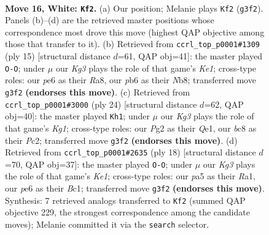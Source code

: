 \documentclass[11pt]{article}
\begin{document}
\begin{figure}[p]
\label{fig:thought-m28}
\end{figure}

\clearpage

\begin{figure}[p]\centering
\begin{subfigure}{0.46\textwidth}\centering
\resizebox{\linewidth}{!}{%
\newchessgame
\chessboard[
  setfen={1nb1qrk1/r1p1nppp/1p2p3/p2pP3/3P1P2/2N3K1/PPP3PP/R2Q1BNR w - - 2 16},
  showmover=false,
  pgfstyle=straightmove, color=movearrow, markmove={g3-f2}
]}
\caption{}
\end{subfigure}\hfill
\begin{subfigure}{0.46\textwidth}\centering
\resizebox{\linewidth}{!}{%
\newchessgame
\chessboard[
  setfen={rn1qk2r/pbpp1ppp/1p2p3/8/2PPn3/P3BNP1/1P2PP1P/R2QKB1R b KQkq - 0 8},
  showmover=false,
  pgfstyle=straightmove, color=movearrow, markmove={e8-g8}
]}
\caption{}
\end{subfigure}
\\[4pt]
\begin{subfigure}{0.46\textwidth}\centering
\resizebox{\linewidth}{!}{%
\newchessgame
\chessboard[
  setfen={r4rk1/p2qppbp/3p1np1/1pp5/4PP2/2NP1R2/PPPB2PP/2R1Q1K1 w - - 0 13},
  showmover=false,
  pgfstyle=straightmove, color=movearrow, markmove={g1-h1}
]}
\caption{}
\end{subfigure}\hfill
\begin{subfigure}{0.46\textwidth}\centering
\resizebox{\linewidth}{!}{%
\newchessgame
\chessboard[
  setfen={1rb1kb1r/5ppp/pq2pn2/1p6/2pP4/2N3P1/PP2PPBP/R1BQK2R w KQk - 0 10},
  showmover=false,
  pgfstyle=straightmove, color=movearrow, markmove={e1-g1}
]}
\caption{}
\end{subfigure}
\caption{\textbf{Move 16, White: \texttt{Kf2}.} (a) Our position; Melanie plays \texttt{Kf2} (\texttt{g3f2}). Panels (b)--(d) are the retrieved master positions whose correspondence most drove this move (highest QAP objective among those that transfer to it). (b) Retrieved from \texttt{ccrl\_top\_p0001\#1309} (ply 15) [structural distance $d$=61, QAP obj=41]: the master played \texttt{O-O}; under $\mu$ our \emph{Kg3} plays the role of that game's \emph{Ke1}; cross-type roles: our \emph{p}e6 as their \emph{R}a8, our \emph{p}b6 as their \emph{N}b8; transferred move \texttt{g3f2} \textbf{(endorses this move)}. (c) Retrieved from \texttt{ccrl\_top\_p0001\#3000} (ply 24) [structural distance $d$=62, QAP obj=40]: the master played \texttt{Kh1}; under $\mu$ our \emph{Kg3} plays the role of that game's \emph{Kg1}; cross-type roles: our \emph{P}g2 as their \emph{Q}e1, our \emph{b}c8 as their \emph{P}c2; transferred move \texttt{g3f2} \textbf{(endorses this move)}. (d) Retrieved from \texttt{ccrl\_top\_p0001\#2635} (ply 18) [structural distance $d$=70, QAP obj=37]: the master played \texttt{O-O}; under $\mu$ our \emph{Kg3} plays the role of that game's \emph{Ke1}; cross-type roles: our \emph{p}a5 as their \emph{R}a1, our \emph{p}e6 as their \emph{B}c1; transferred move \texttt{g3f2} \textbf{(endorses this move)}. Synthesis: 7 retrieved analogs transferred to \texttt{Kf2} (summed QAP objective 229, the strongest correspondence among the candidate moves); Melanie committed it via the \texttt{search} selector.}

\end{figure}
\end{document}
